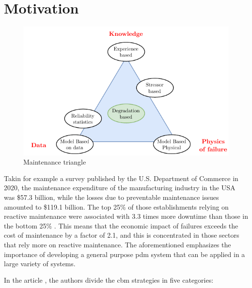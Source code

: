 \section{Motivation}
\label{sec:motivation}

\begin{figure}
    \centering
    \includegraphics[scale=1.3]{images/Intro/MaintTriangle.pdf}
    \caption{Maintenance triangle}
    \label{fig:MaintTriangle}
\end{figure} 

Takin for example a survey published by the U.S. Department of Commerce in 2020, the maintenance expenditure of the manufacturing industry in the USA was \$57.3 billion, while the losses due to preventable maintenance issues amounted to \$119.1 billion. The top 25\% of those 
establishments relying on reactive maintenance were associated with 3.3 times more downtime 
than those in the bottom 25\% \cite{NIST}. This means that the economic impact of failures exceeds the cost of maintenance by a factor of 2.1, and this is concentrated in those sectors that rely more on reactive maintenance. The aforementioned emphasizes the importance of developing a general purpose \gls{pdm} system that can be applied in a large variety of systems.

In the article \cite{Maintenance_cat}, the authors divide the \gls{cbm} strategies in five categories:

